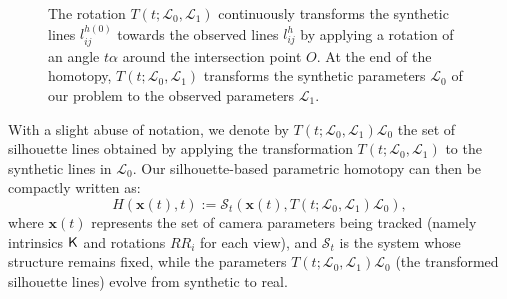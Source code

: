\begin{figure}
\centering
        \caption{The rotation $T(t; \mathcal{L}_0, \mathcal{L}_1)$ continuously transforms the synthetic lines $l^{h(0)}_{ij}$ towards the observed lines $l^{h}_{ij}$ by applying a rotation of an angle $t\alpha$ around the intersection point $O$. At the end of the homotopy, $T(t; \mathcal{L}_0, \mathcal{L}_1)$  transforms the synthetic parameters $\mathcal{L}_0$ of our problem to the observed parameters $\mathcal{L}_1$.}\label{fig:transformation}
\end{figure}

With a slight abuse of notation, we denote by $T(t; \mathcal{L}_0, \mathcal{L}_1)\mathcal{L}_0$ the set of silhouette lines obtained by applying the transformation $T(t; \mathcal{L}_0, \mathcal{L}_1)$ to the synthetic lines in $\mathcal{L}_0$. Our silhouette-based parametric homotopy can then be compactly written as:
\begin{equation}
    H(\mathbf{x}(t), t) := \mathcal{S}_t(\mathbf{x}(t), T(t; \mathcal{L}_0, \mathcal{L}_1)\mathcal{L}_0),
    \label{eq:LineCameraHomotopy}
\end{equation}
where $\mathbf{x}(t)$ represents the set of camera parameters being tracked (namely intrinsics $\mathsf{K}$ and rotations $RR_i$ for each view), and $\mathcal{S}_t$ is the system whose structure remains fixed, while the parameters $T(t; \mathcal{L}_0, \mathcal{L}_1)\mathcal{L}_0$ (the transformed silhouette lines) evolve from synthetic to real.

